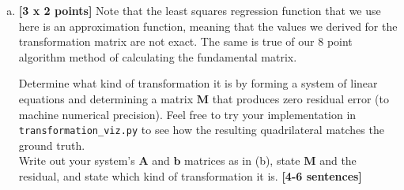 \begin{enumerate}[(a)]
\item \textbf{[3 x 2 points]} Note that the least squares regression function that we use here is an approximation function, meaning that the values we derived for the transformation matrix are not exact. The same is true of our 8 point algorithm method of calculating the fundamental matrix.

\begin{tcolorbox}[colback=orange!5!white,colframe=orange!75!black]
Determine what kind of transformation it is by forming a system of linear equations and determining a matrix $\bm{M}$ that produces zero residual error (to machine numerical precision). Feel free to try your implementation in \texttt{transformation\_viz.py} to see how the resulting quadrilateral matches the ground truth.
\\ 
    
Write out your system's $\bm{A}$ and $\bm{b}$ matrices as in (b), state $\bm{M}$ and the residual, and state which kind of transformation it is. \textbf{[4-6 sentences]}
\end{tcolorbox}


\end{enumerate}





\pagebreak
